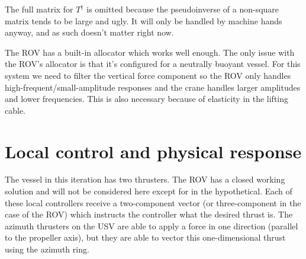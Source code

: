 \documentclass[class=article, crop=false, draft=true]{standalone}
\begin{document}
The full matrix for \(T^\dagger\) is omitted because the pseudoinverse of a non-square matrix tends to be large and ugly. It will only be handled by machine hands anyway, and as such doesn't matter right now.

The ROV has a built-in allocator which works well enough. The only issue with the ROV's allocator is that it's configured for a neutrally buoyant vessel. For this system we need to filter the vertical force component so the ROV only handles high-frequent/small-amplitude responses and the crane handles larger amplitudes and lower frequencies. This is also necessary because of elasticity in the lifting cable.

\section{Local control and physical response}
The vessel in this iteration has two thrusters. The ROV has a closed working solution and will not be considered here except for in the hypothetical. Each of these local controllers receive a two-component vector (or three-component in the case of the ROV) which instructs the controller what the desired thrust is. The azimuth thrusters on the USV are able to apply a force in one direction (parallel to the propeller axis), but they are able to vector this one-dimensional thrust using the azimuth ring.
\end{document}
